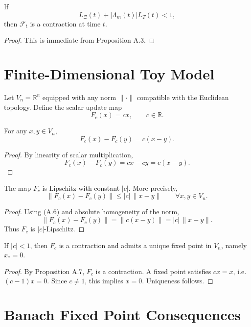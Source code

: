 \documentclass[11pt]{article}
\begin{document}
\begin{corollary}
If
\[
L_{\Xi}(t)+|\Lambda_m(t)|L_T(t) < 1, \tag{A.4}
\]
then $\mathcal{F}_t$ is a contraction at time $t$.
\end{corollary}

\begin{proof}
This is immediate from Proposition A.3.
\end{proof}

\section{Finite-Dimensional Toy Model}
Let $V_n = \mathbb{R}^n$ equipped with any norm $\|\cdot\|$ compatible with the Euclidean topology. Define the scalar update map
\[
F_c(x)=cx, \qquad c\in\mathbb{R}. \tag{A.5}
\]

\begin{lemma}
For any $x,y\in V_n$,
\[
F_c(x)-F_c(y)=c(x-y). \tag{A.6}
\]
\end{lemma}

\begin{proof}
By linearity of scalar multiplication,
\[
F_c(x)-F_c(y)=cx-cy=c(x-y).
\]
\end{proof}

\begin{proposition}
The map $F_c$ is Lipschitz with constant $|c|$. More precisely,
\[
\|F_c(x)-F_c(y)\| \le |c|\,\|x-y\| \qquad \forall x,y\in V_n. \tag{A.7}
\]
\end{proposition}

\begin{proof}
Using \textup{(A.6)} and absolute homogeneity of the norm,
\[
\|F_c(x)-F_c(y)\| = \|c(x-y)\| = |c|\,\|x-y\|.
\]
Thus $F_c$ is $|c|$-Lipschitz.
\end{proof}

\begin{corollary}
If $|c|<1$, then $F_c$ is a contraction and admits a unique fixed point in $V_n$, namely $x_*=0$.
\end{corollary}

\begin{proof}
By Proposition A.7, $F_c$ is a contraction. A fixed point satisfies $cx=x$, i.e.
$(c-1)x=0$. Since $c\neq 1$, this implies $x=0$. Uniqueness follows.
\end{proof}

\section{Banach Fixed Point Consequences}
\end{document}

